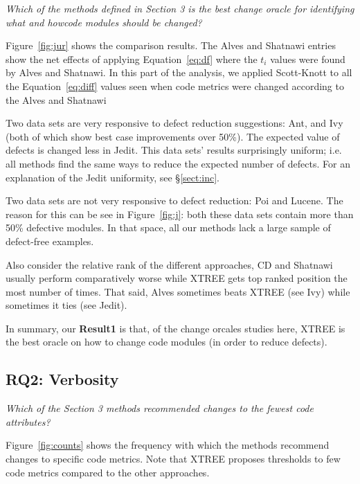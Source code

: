\documentclass[twocolumn,5p]{elsarticle}
\newcommand{\tion}[1]{\S\ref{sect:#1}}
\newcommand{\fig}[1]{Figure~\ref{fig:#1}}
\newcommand{\eq}[1]{Equation~\ref{eq:#1}}
\theoremstyle{break}
\begin{document}
\begin{itemize}
		{\em Which of the methods defined in Section 3 is the best change oracle for identifying what and howcode modules should be changed? }
		
		\fig{jur} shows the comparison results.  The Alves and Shatnawi
		entries show the net effects of applying \eq{df} where the $t_i$ values were found by Alves and Shatnawi.
		In this part of the  analysis,
		we applied Scott-Knott to all the \eq{diff} values
		seen when code metrics were changed
		according to the  Alves and Shatnawi
		
		
		Two data sets are very responsive to defect reduction suggestions:
		Ant, and Ivy (both of which show best case improvements over 50\%).
		The  expected value of defects  
		is changed less in Jedit. This data sets' results
		surprisingly uniform; i.e.   all methods
		find the same ways to reduce the expected number of
		defects.   For an explanation of the Jedit uniformity, see \tion{inc}.
		
		Two data sets are not very responsive to defect reduction:
		Poi and Lucene. The reason for this can be see in \fig{j}:
		both these data sets contain more than 50\% defective modules.
		In that space, all our  methods lack a large sample of
		defect-free examples. 
		
		Also consider the relative
		rank of the different approaches,
		CD and Shatnawi usually  perform comparatively worse while  XTREE gets top ranked position the most
		number of times. That said, Alves sometimes beats XTREE (see Ivy)
		while sometimes it ties (see Jedit).
		
		In summary, our {\bf Result1} is  that, of the change orcales studies here,
		XTREE is the best oracle on how to change code modules (in order to reduce defects).
		
		
		
		\subsection{RQ2: Verbosity}
		
		{\em Which of the Section 3 methods recommended changes to the fewest code attributes?}
		
		\fig{counts} shows the frequency with which the methods
		recommend changes to specific code metrics.
		Note that XTREE proposes thresholds to
		few code metrics compared to the other approaches. 
		
		

\end{itemize}
\end{document}
